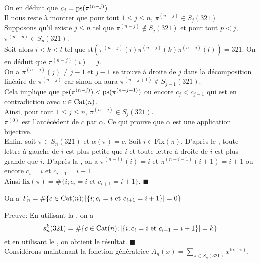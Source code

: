On en déduit que $c_{j} = \begin{rm}ps\end{rm}(\pi^{(n-j)})$\vspace{7pt}\\
Il nous reste à montrer que pour tout $1 \leq j \leq n$,  $\pi^{(n-j)}\in S_{j}(321)$\\
Supposons qu'il existe $j\leq n$ tel que $\pi^{(n-j)} \notin S_{j}(321)$ et pour tout $p<j$, $\pi^{(n-p)}\in S_{p}(321)$.\\
Soit alors $i<k<l$ tel que st$(\pi^{(n-j)}(i)\pi^{(n-j)}(k)\pi^{(n-j)}(l))=321$.
On en déduit que $\pi^{(n-j)}(i)=j$.\\
On a $\pi^{(n-j)}(j)\neq j-1$ et  $j-1$ se trouve à droite de $j$  dans la décomposition linéaire de $\pi^{(n-j)}$ car sinon on aura $\pi^{(n-j+1)}\notin S_{j-1}(321)$.\\
Cela implique que $\begin{rm}ps\end{rm}(\pi^{(n-j)})< \begin{rm}ps\end{rm}(\pi^{(n-j+1)})$ ou encore $c_{j}<c_{j-1}$ qui est en contradiction avec $c\in \begin{rm}Cat\end{rm}(n)$.\\
Ainsi, pour tout $1 \leq j \leq n$,   $\pi^{(n-j)}\in S_{j}(321)$.\\
$\pi^{(0)}$ est l'antécédent de $c$ par $\alpha$. Ce qui prouve que $\alpha$ est une application bijective.\vspace{10pt}\\
Enfin, soit $\pi\in S_{n}(321)$ et $\alpha(\pi)=c$. Soit $i\in \text{Fix}(\pi)$.
D'après le , toute lettre à gauche de $i$ est plus petite que $i$ et toute lettre à droite de $i$ est plus grande que $i$. D'après la , on a $\pi^{(n-i)}(i)=i$ et $\pi^{(n-i-1)}(i+1)=i+1$ ou encore $c_{i}=i$ et $c_{i+1}=i+1$\\
Ainsi fix$(\pi)=\#\{i; c_{i}=i \text{ et }c_{i+1}=i+1\}$. $\blacksquare$

\begin{corollaire}
	On a $F_{n}= \#\{ c\in \begin{rm}Cat\end{rm}(n); | \{i; c_{i}=i \text{ et } c_{i+1}=i+1\} |=0 \}$
\end{corollaire}
Preuve: En utilisant la , on a $$s_{n}^{k}(321) = \#\{ c\in \begin{rm}Cat\end{rm}(n); | \{i; c_{i}=i \text{ et } c_{i+1}=i+1\} |=k \}$$ et en utilisant le , on obtient le résultat. $\blacksquare$\vspace{10pt}\\
Considérons maintenant la fonction génératrice $A_{n}(x)= \underset{\pi \in S_{n}(321)}{\sum}x^{\text{fix}(\pi)}$.

